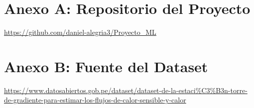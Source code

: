 

\maketitle
\tableofcontents
\newpage


\newpage

\newpage

\newpage

\newpage

\newpage

\newpage

\appendix

\section*{Anexo A: Repositorio del Proyecto}
\label{sec:anexoA}
\url{https://github.com/daniel-alegria3/Proyecto_ML}

\section*{Anexo B: Fuente del Dataset}
\label{sec:anexoB}
\url{https://www.datosabiertos.gob.pe/dataset/dataset-de-la-estaci\%C3\%B3n-torre-de-gradiente-para-estimar-los-flujos-de-calor-sensible-y-calor}



